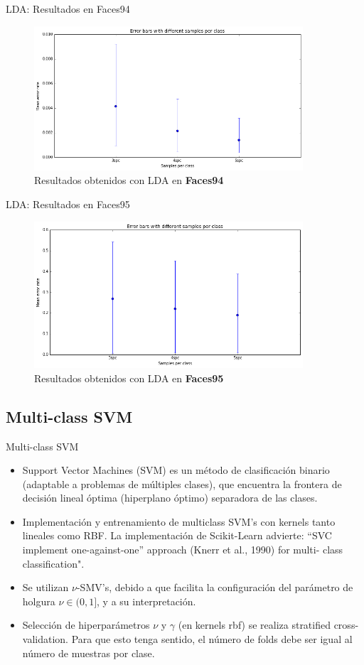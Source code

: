 \documentclass{beamer}
\begin{document}
\begin{frame}{LDA: Resultados en Faces94}
\begin{figure}[htpb!]
\centering
\includegraphics[width=10cm]{lda_res94}
\caption{Resultados obtenidos con LDA en \textbf{Faces94}}
\end{figure}
\end{frame}

\begin{frame}{LDA: Resultados en Faces95}
\begin{figure}[htpb!]
\centering
\includegraphics[width=10cm]{lda_res95}
\caption{Resultados obtenidos con LDA en \textbf{Faces95}}
\end{figure}
\end{frame}

\subsection{Multi-class SVM}

\begin{frame}{Multi-class SVM}
\begin{itemize}
    \item Support Vector Machines (SVM) es un método de clasificación binario (adaptable a problemas de múltiples clases), que encuentra la frontera de decisión lineal óptima (hiperplano óptimo) separadora de las clases.
    \item Implementación y entrenamiento de multiclass SVM's con kernels tanto lineales como RBF. La implementación de Scikit-Learn advierte: “SVC implement one-against-one” approach (Knerr et al., 1990) for multi- class classification".
    \item Se utilizan $\nu$-SMV's, debido a que facilita la configuración del parámetro de holgura $\nu \in (0,1]$, y a su interpretación.
    \item Selección de hiperparámetros $\nu$ y $\gamma$ (en kernels rbf) se realiza stratified cross-validation. Para que esto tenga sentido, el número de folds debe ser igual al número de muestras por clase.
\end{itemize}
\end{frame}
\end{document}
